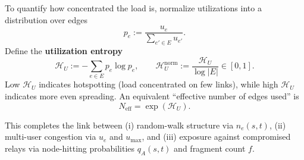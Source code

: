 \documentclass[journal]{IEEEtran}
\begin{document}
To quantify how concentrated the load is, normalize utilizations into a distribution over edges
$$
p_e
:=
\frac{u_e}{\sum_{e'\in E} u_{e'}}.
$$
Define the \textbf{utilization entropy}
$$
\mathcal{H}_U
:=
-\sum_{e\in E} p_e \log p_e,
\qquad
\mathcal{H}_U^{\mathrm{norm}}
:=
\frac{\mathcal{H}_U}{\log|E|}
\in[0,1].
$$
Low $\mathcal{H}_U$ indicates hotspotting (load concentrated on few links),
while high $\mathcal{H}_U$ indicates more even spreading.
An equivalent ``effective number of edges used'' is
$$
N_{\mathrm{eff}}=\exp(\mathcal{H}_U).
$$

This completes the link between
(i) random-walk structure via $n_e(s,t)$,
(ii) multi-user congestion via $u_e$ and $u_{\max}$, and
(iii) exposure against compromised relays via node-hitting probabilities
$q_A(s,t)$ and fragment count $f$.



% 
% 
\end{document}
